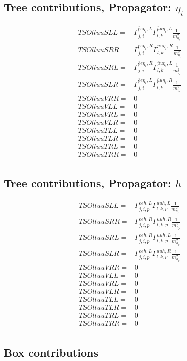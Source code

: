 \documentclass[A4,landscape]{article}
\begin{document}
\subsection{Tree contributions, Propagator: $\eta_i$} 

\begin{align} 
  TSOlluuSLL= & \Gamma^{\bar{e}e \eta_i ,L}_{j, i} \Gamma^{\bar{u}u \eta_i ,L}_{l, k} \frac{1}{m^2_{\eta_i}} \\ 
  TSOlluuSRR= & \Gamma^{\bar{e}e \eta_i ,R}_{j, i} \Gamma^{\bar{u}u \eta_i ,R}_{l, k} \frac{1}{m^2_{\eta_i}} \\ 
  TSOlluuSRL= & \Gamma^{\bar{e}e \eta_i ,R}_{j, i} \Gamma^{\bar{u}u \eta_i ,L}_{l, k} \frac{1}{m^2_{\eta_i}} \\ 
  TSOlluuSLR= & \Gamma^{\bar{e}e \eta_i ,L}_{j, i} \Gamma^{\bar{u}u \eta_i ,R}_{l, k} \frac{1}{m^2_{\eta_i}} \\ 
  TSOlluuVRR= & 0 \\ 
  TSOlluuVLL= & 0 \\ 
  TSOlluuVRL= & 0 \\ 
  TSOlluuVLR= & 0 \\ 
  TSOlluuTLL= & 0 \\ 
  TSOlluuTLR= & 0 \\ 
  TSOlluuTRL= & 0 \\ 
  TSOlluuTRR= & 0 \\ 
\end{align} 
\subsection{Tree contributions, Propagator: $h$} 

\begin{align} 
  TSOlluuSLL= & \Gamma^{\bar{e}e h ,L}_{j, i, p} \Gamma^{\bar{u}u h ,L}_{l, k, p} \frac{1}{m^2_{h_{{p}}}} \\ 
  TSOlluuSRR= & \Gamma^{\bar{e}e h ,R}_{j, i, p} \Gamma^{\bar{u}u h ,R}_{l, k, p} \frac{1}{m^2_{h_{{p}}}} \\ 
  TSOlluuSRL= & \Gamma^{\bar{e}e h ,R}_{j, i, p} \Gamma^{\bar{u}u h ,L}_{l, k, p} \frac{1}{m^2_{h_{{p}}}} \\ 
  TSOlluuSLR= & \Gamma^{\bar{e}e h ,L}_{j, i, p} \Gamma^{\bar{u}u h ,R}_{l, k, p} \frac{1}{m^2_{h_{{p}}}} \\ 
  TSOlluuVRR= & 0 \\ 
  TSOlluuVLL= & 0 \\ 
  TSOlluuVRL= & 0 \\ 
  TSOlluuVLR= & 0 \\ 
  TSOlluuTLL= & 0 \\ 
  TSOlluuTLR= & 0 \\ 
  TSOlluuTRL= & 0 \\ 
  TSOlluuTRR= & 0 \\ 
\end{align} 
\subsection{Box contributions} 
\end{document}
